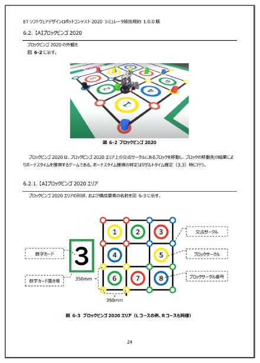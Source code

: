 \documentclass[uplatex, report, a4j, 10pt]{jsbook}
\begin{document}
\begin{figure}[tp]
    \begin{center}
    \includegraphics[width=\hsize]{specification/ET_11.eps}
    \end{center}
\end{figure}
\end{document}

